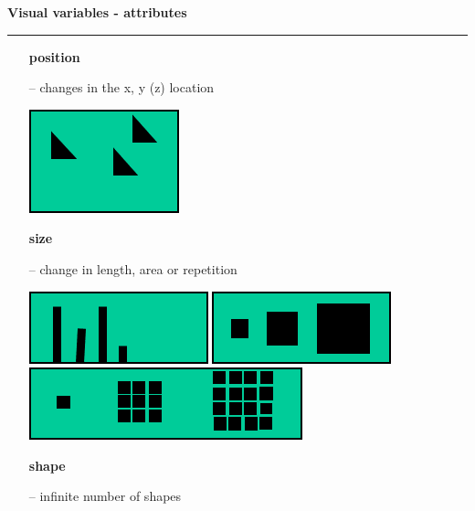 \documentclass[pdf]{beamer}
\begin{document}
\begin{frame}
{\textbf{Visual variables - attributes}}{\textcolor{red}{\rule{12cm}{1.2pt}}}

     \begin{itemize}   
     	\item[]\hspace{-15px}\textbf{{{position}}}             	   	
        \item[--]{\small{changes in the x, y (z) location}}   	

\includegraphics[scale=0.45]{2_Imagine1.png}
                  
        \item[]\hspace{-15px}\textbf{{size}}     	
        \item[--]{\small{change in length, area or repetition}}   

\includegraphics[scale=0.4]{2_Imagine2.png}
\includegraphics[scale=0.4]{2_Imagine3.png}              
\includegraphics[scale=0.4]{2_Imagine4.png}               
        
     	\item[]\hspace{-15px}\textbf{{shape}}     	
        \item[--]{\small{infinite number of shapes}}      


\end{itemize}
\end{frame}
\end{document}
